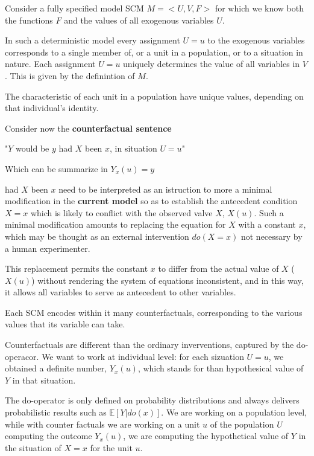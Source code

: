 Consider a fully specified model SCM $M=<U, V,F>$ for which we know both the 
functions $F$ and the values of all exogenous variables $U$. 

In such a deterministic model every assignment $U=u$ to the exogenous variables 
corresponds to a single member of, or a unit in a population, or to a situation in nature. 
Each assignment $U=u$ uniquely determines the value of all variables in $V$. This 
is given by the definintion of $M$.

The characteristic of each unit in a population have unique values, depending on 
that individual's identity.

Consider now the \textbf{counterfactual sentence} 
\begin{center}
    "$Y$ would be $y$ had $X$ been $x$, in situation $U=u$"         
\end{center}
Which can be summarize in $Y_x(u) = y$ 


had $X$ been $x$ need to be interpreted as an istruction to more a minimal modification 
in the \textbf{current model} so as to establish the antecedent condition $X = x$ which is 
likely to conflict with the observed valve $X$, $X(u)$. Such a minimal modification 
amounts to replacing the equation for $X$ with a constant $x$, which may be thought 
as an external intervention $do(X=x)$ not necessary by a human experimenter. 

This replacement permits the constant $x$ to differ from the actual value of $X$ ($X(u)$) 
without rendering the system of equations inconsistent, and in this way, it allows 
all variables to serve as antecedent to other variables. 

Each SCM encodes within it many counterfactuals, corresponding to the various values 
that its variable can take. 

Counterfactuals are different than the ordinary inverventions, captured by the do-operacor. 
We want to work at individual level: for each sizuation $U =u$, we obtained a definite 
number, $Y_x (u)$, which stands for than hypothesical value of $Y$ in that situation.

The do-operator is only defined on probability distributions and always delivers 
probabilistic results such as $\mathbb{E}[Y| do(x)]$. We are working on a population 
level, while with counter factuals we are working on a unit $u$ of the population $U$ 
computing the outcome $Y_x(u)$, we are computing the hypothetical value of $Y$ 
in the situation of $X=x$ for the unit $u$.

